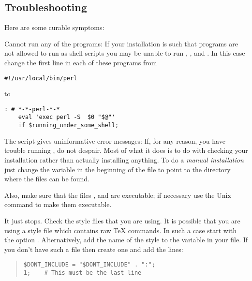 \subsection{Troubleshooting}%
%
Here are some curable symptoms:

\begin{htmllist}
\item [Cannot run any of the \Perl{} programs: ]
If your \Perl{} installation is such that \Perl{} programs are not allowed
to run as shell scripts you may be unable to run
, ,  and  .
In this case change the first line in each of these
programs from
\begin{small}
\begin{verbatim}
#!/usr/local/bin/perl
\end{verbatim}
\end{small}%
to
\begin{small}%
\begin{verbatim}
: # *-*-perl-*-*
    eval 'exec perl -S  $0 "$@"'
    if $running_under_some_shell;
\end{verbatim}
\end{small}

\item [The \fn{install-test} script gives uninformative error messages: ]
If, for any reason, you have trouble running ,
do not despair. Most of what it does is to do with checking
your installation rather than actually installing anything.
To do a \textit{manual installation} just change the variable
 in the beginning of the file 
to point to the directory where the \latextohtml{} files can be found.

Also, make sure that the files
,  and  are executable;
if necessary use the Unix  command to make them
executable.

\item [It just stops. ] Check the style
files that you are using. It is possible that you are using
a style file which contains raw \TeX{} commands. In such a case
start \latextohtml{} with the option
.
Alternatively, add the name of the style to the variable
 in your
 file. If you don't have such a file then
create one and add the lines:
\begin{quote}
\begin{small}
\verb|$DONT_INCLUDE = "$DONT_INCLUDE" . ":|\verb|";|\\
\verb|1; 	# This must be the last line|
\end{small}
\end{quote}


\end{htmllist}
